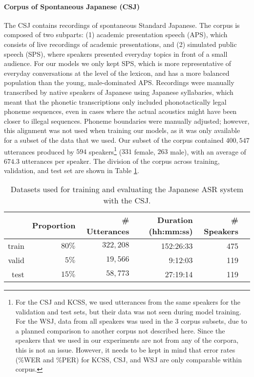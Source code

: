 \paragraph{Corpus of Spontaneous Japanese (CSJ)}
The CSJ \cite{maekawa2003} contains recordings of spontaneous Standard Japanese. The corpus is composed of two subparts: (1) academic presentation speech (APS), which consists of live recordings of academic presentations, and (2) simulated public speech (SPS), where speakers presented everyday topics in front of a small audience. For our models we only kept SPS, which is more representative of everyday conversations at the level of the lexicon, and has a more balanced population than the young, male-dominated APS.
Recordings were manually transcribed by native speakers of Japanese using Japanese syllabaries, which meant that the phonetic transcriptions only included phonotactically legal phoneme sequences, even in cases where the actual acoustics might have been closer to illegal sequences. Phoneme boundaries were manually adjusted; however, this alignment was not used when training our models, as it %
was only available for a subset of the data that we used. 
Our subset of the corpus contained $400,547$ utterances produced by $594$ speakers\footnote{For the CSJ and KCSS, we used utterances from the same speakers for the validation and test sets, but their data was not seen during model training. For the WSJ, data from all speakers was used in the 3 corpus subsets, due to a planned comparison to another corpus not described here. Since the speakers that we used in our experiments are not from any of the corpora, this is not an issue. However, it needs to be kept in mind that error rates (\%WER and \%PER) for KCSS, CSJ, and WSJ are only comparable within corpus.} ($331$ female, $263$ male), with an average of $674.3$ utterances per speaker. The division of the corpus across training, validation, and test set are shown in Table \ref{tab:hmm_csj}.

\begin{table}[htb]
\centering
\caption{Datasets used for training and evaluating the Japanese ASR system with the CSJ.}
\label{tab:hmm_csj}
\vspace{0.25cm}
\begin{tabular}{rrrrrr}
  \toprule
      & Proportion &\# Utterances & Duration (hh:mm:ss) & \# Speakers &  \\ \midrule
  train & $80\%$ &  $322,208$            & 152:26:33     &   475          &  \\
  valid & $5\%$ &  $19,566$         &  9:12:03    &   119          &  \\
  test  & $15\%$ &  $58,773$        &  27:19:14    &  119           & \\ \bottomrule
\end{tabular}
\end{table}

